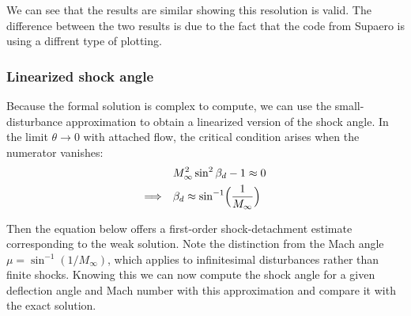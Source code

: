 We can see that the results are similar showing this resolution is valid. The difference between the two results is due to the fact that the code from Supaero is using a diffrent type of plotting.

\subsubsection{Linearized shock angle}
Because the formal solution is complex to compute, we can use the small-disturbance approximation to obtain a linearized version of the shock angle. In the limit \(\theta\to0\) with attached flow, the critical condition arises when the numerator vanishes:
\begin{align}
	&M_\infty^2\sin^2\beta_d - 1 \approx 0\\
	\Longrightarrow \quad &\beta_d \approx \sin^{-1}\Bigl(\frac{1}{M_\infty}\Bigr)
\end{align}
\label{eq:beta_d}

Then the equation below offers a first-order shock-detachment estimate corresponding to the weak solution. Note the distinction from the Mach angle \(\mu=\sin^{-1}(1/M_\infty)\), which applies to infinitesimal disturbances rather than finite shocks. 
Knowing this we can now compute the shock angle for a given deflection angle and Mach number with this approximation and compare it with the exact solution. 

